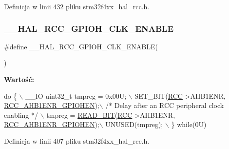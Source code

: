 Definicja w linii 432 pliku stm32f4xx\+\_\+hal\+\_\+rcc.\+h.

\mbox{\label{group___r_c_c___a_h_b1___clock___enable___disable_ga041e72359b94f19569e774030fc6ebff}} 
\subsubsection{\texorpdfstring{\+\_\+\+\_\+\+H\+A\+L\+\_\+\+R\+C\+C\+\_\+\+G\+P\+I\+O\+H\+\_\+\+C\+L\+K\+\_\+\+E\+N\+A\+B\+LE}{\_\_HAL\_RCC\_GPIOH\_CLK\_ENABLE}}
{\footnotesize\ttfamily \#define \+\_\+\+\_\+\+H\+A\+L\+\_\+\+R\+C\+C\+\_\+\+G\+P\+I\+O\+H\+\_\+\+C\+L\+K\+\_\+\+E\+N\+A\+B\+LE(\begin{DoxyParamCaption}{ }\end{DoxyParamCaption})}

{\bfseries Wartość\+:}
\begin{DoxyCode}
\textcolor{keywordflow}{do} \{ \(\backslash\)
                                        \_\_IO uint32\_t tmpreg = 0x00U; \(\backslash\)
                                        SET\_BIT(\hyperlink{group___peripheral__declaration_ga74944438a086975793d26ae48d5882d4}{RCC}->AHB1ENR, 
      \hyperlink{group___peripheral___registers___bits___definition_gadb16afc550121895822ebb22108196b6}{RCC\_AHB1ENR\_GPIOHEN});\(\backslash\)
                                        \textcolor{comment}{/* Delay after an RCC peripheral clock enabling */} \(\backslash\)
                                        tmpreg = \hyperlink{group___exported__macro_ga822bb1bb9710d5f2fa6396b84e583c33}{READ\_BIT}(\hyperlink{group___peripheral__declaration_ga74944438a086975793d26ae48d5882d4}{RCC}->AHB1ENR, 
      \hyperlink{group___peripheral___registers___bits___definition_gadb16afc550121895822ebb22108196b6}{RCC\_AHB1ENR\_GPIOHEN});\(\backslash\)
                                        UNUSED(tmpreg); \(\backslash\)
                                         \} \textcolor{keywordflow}{while}(0U)
\end{DoxyCode}


Definicja w linii 407 pliku stm32f4xx\+\_\+hal\+\_\+rcc.\+h.

